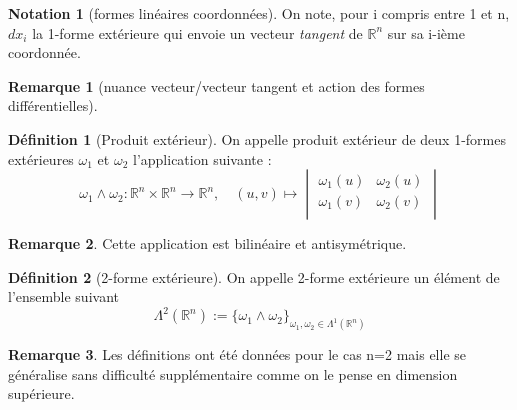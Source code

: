 \documentclass{article}
\newcommand{\R}{\mathbb{R}} %
\theoremstyle{definition} %
\newtheorem{defi}{Définition}
\newtheorem{rmq}{Remarque}
\newtheorem{nota}{Notation}
\newcommand{\1}{\mathbb{1}} %
\begin{document}
\begin{nota}[formes linéaires coordonnées]
On note, pour i compris entre 1 et n, $dx_i$ la 1-forme extérieure qui envoie un vecteur \textit{tangent} de $\R^n$ sur sa i-ième coordonnée.
\end{nota}

\begin{rmq}[nuance vecteur/vecteur tangent et action des formes différentielles]

\end{rmq}

\begin{defi}[Produit extérieur]
On appelle produit extérieur de deux 1-formes extérieures $\omega_1$ et $\omega_2$ l'application suivante :
$$\omega_1 \wedge \omega_2 : \R^n \times \R^n \to \R^n, \quad (u,v) \mapsto \begin{vmatrix}
    \omega_1(u) & \omega_2(u) \\
    \omega_1(v) & \omega_2(v) \\
\end{vmatrix}  $$
\end{defi}
\begin{rmq}
Cette application est bilinéaire et antisymétrique.
\end{rmq}
\begin{defi}[2-forme extérieure]
On appelle 2-forme extérieure un élément de l'ensemble suivant
$$\Lambda^2 (\R^n) := \{\omega_1 \wedge \omega_2\}_{\omega_1,\omega_2 \in \Lambda^1 (\R^n)}$$
\end{defi}
\begin{rmq}
Les définitions ont été données pour le cas n=2 mais elle se généralise sans difficulté supplémentaire comme on le pense en dimension supérieure.
\end{rmq}
\end{document}
